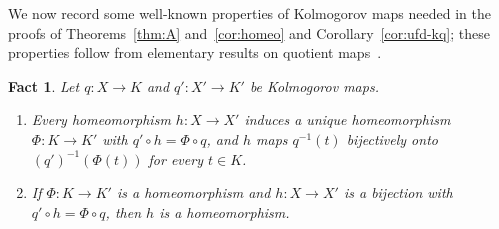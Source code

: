 \documentclass[12pt,reqno,a4paper]{amsart}
\theoremstyle{plain}
\newtheorem{fact}[theorem]{Fact}
\theoremstyle{definition}
\begin{document}
We now record some well-known properties of Kolmogorov maps needed in the proofs of Theorems~\ref{thm:A} and~\ref{cor:homeo} and Corollary~\ref{cor:ufd-kq}; these properties follow from elementary results on quotient maps~\cite[Section~22]{Munkres}.
\begin{fact}\label{fact:kolmogorov}
Let $q\colon X\to K$ and $q'\colon X'\to K'$ be Kolmogorov maps.
\begin{enumerate}[label=\textup{(\alph*)}]
\item Every homeomorphism $h\colon X\to X'$ induces a unique homeomorphism $\Phi\colon K\to K'$ with $q'\circ h=\Phi\circ q$, and $h$ maps $q^{-1}(t)$ bijectively onto $(q')^{-1}(\Phi(t))$ for every $t\in K$.
\item If $\Phi\colon K\to K'$ is a homeomorphism and $h\colon X\to X'$ is a bijection with $q'\circ h=\Phi\circ q$, then $h$ is a homeomorphism.
\end{enumerate}
\end{fact}
\end{document}
